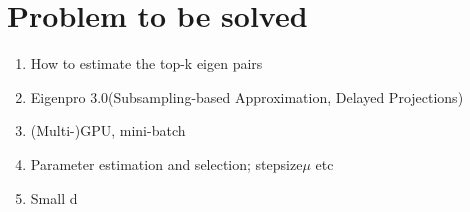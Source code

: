 \documentclass{article}
\begin{document}
\section{Problem to be solved}
\begin{enumerate}
    \item How to estimate the top-k eigen pairs
    \item Eigenpro 3.0(Subsampling-based Approximation, Delayed Projections)
    \item (Multi-)GPU, mini-batch 
    \item Parameter estimation and selection; stepsize\(\mu\) etc
    \item Small d
\end{enumerate}
\end{document}
